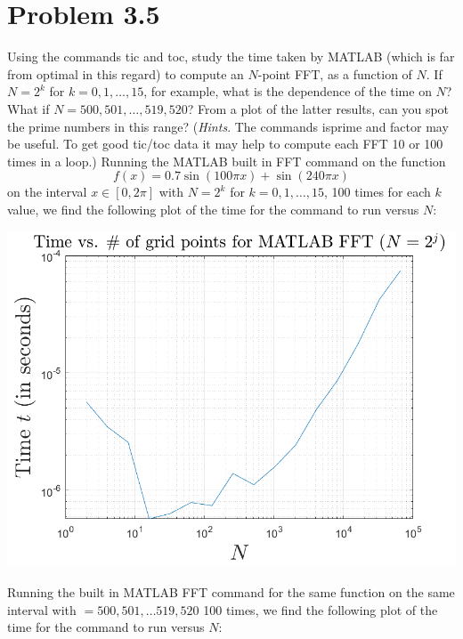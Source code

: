 \documentclass{article}
\begin{document}
\section*{Problem 3.5}
Using the commands tic and toc, study the time taken by MATLAB (which is far from optimal in this regard) to compute an $N$-point FFT, as a function of $N$. If $N=2^k$ for $k=0,1,\dots,15$, for example, what is the dependence of the time on $N$? What if $N=500,501, \dots, 519, 520$? From a plot of the latter results, can you spot the prime numbers in this range? (\textit{Hints}. The commands isprime and factor may be useful. To get good tic/toc data it may help to compute each FFT 10 or 100 times in a loop.)
\newline\newline
Running the MATLAB built in FFT command on the function
\[f(x) = 0.7\sin(100\pi x) + \sin(240\pi x)\]
on the interval $x \in [0, 2\pi]$ with $N = 2^k$ for $k=0,1,\dots, 15$, 100 times for each $k$ value, we find the following plot of the time for the command to run versus $N$:
\begin{center}
    \includegraphics[scale = 0.44]{powersof2fft.png}
\end{center}
Running the built in MATLAB FFT command for the same function on the same interval with $ = 500,501,\dots 519,520$ 100 times, we find the following plot of the time for the command to run versus $N$:
\end{document}
